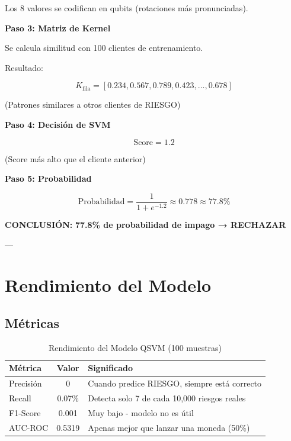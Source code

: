 \documentclass[11pt,a4paper,spanish]{article}
\begin{document}
Los 8 valores se codifican en qubits (rotaciones más pronunciadas).

\textbf{Paso 3: Matriz de Kernel}

Se calcula similitud con 100 clientes de entrenamiento.

Resultado:

\[
K_{\text{fila}} = [0.234, 0.567, 0.789, 0.423, \ldots, 0.678]
\]

(Patrones similares a otros clientes de RIESGO)

\textbf{Paso 4: Decisión de SVM}

\[
\text{Score} = 1.2
\]

(Score más alto que el cliente anterior)

\textbf{Paso 5: Probabilidad}

\[
\text{Probabilidad} = \frac{1}{1 + e^{-1.2}} \approx 0.778 \approx 77.8\%
\]

\textbf{CONCLUSIÓN:} \textbf{77.8\% de probabilidad de impago → RECHAZAR}

---

\section{Rendimiento del Modelo}

\subsection{Métricas}

\begin{table}[H]
\centering
\begin{tabular}{|l|c|l|}
\hline
\textbf{Métrica} & \textbf{Valor} & \textbf{Significado} \\
\hline
Precisión & 0 & Cuando predice RIESGO, siempre está correcto \\
\hline
Recall & 0.07\% & Detecta solo 7 de cada 10,000 riesgos reales \\
\hline
F1-Score & 0.001 & Muy bajo - modelo no es útil \\
\hline
AUC-ROC & 0.5319 & Apenas mejor que lanzar una moneda (50\%) \\
\hline
\end{tabular}
\caption{Rendimiento del Modelo QSVM (100 muestras)}
\end{table}
\end{document}
